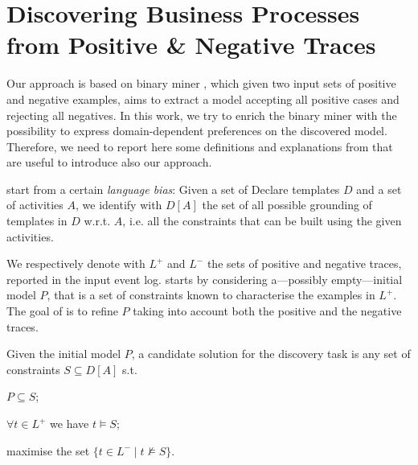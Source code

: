 
\section{Discovering Business Processes from Positive \& Negative Traces}
\label{sec:deviant}



Our approach is based on \nd binary miner \cite{deviant-tkde}, which given two input sets of positive and negative examples, aims to extract a model accepting all positive cases and rejecting all negatives. 
In this work, we try to enrich the binary miner with the possibility to express domain-dependent preferences on the discovered model. Therefore, we need to report here some definitions and explanations from \cite{deviant-tkde} that are useful to introduce also our approach.

\nd start from a certain \emph{language bias}: Given a set of Declare templates $D$ and a set of activities $A$, we identify with $D[A]$ the set of all possible grounding of templates in $D$ w.r.t. $A$, i.e. all the constraints that can be built using the given activities.

We respectively denote with $L^+$ and $L^-$ the sets of positive and negative traces, reported in the input event log. \nd starts by considering a---possibly empty---initial model $P$, that is a set of \declare constraints known to characterise the examples in $L^+$. The goal of \nd is to refine $P$ taking into account both the positive and the negative traces.

\begin{definition}{}\label{def:cand}
Given the initial model $P$, a candidate solution for the discovery task is any set of constraints $S\subseteq D[A]$ s.t.
\begin{enumerate*} [label=\textit{(\roman*)}]
  \item $P\subseteq S$;
  \item $\forall t\in L^+$ we have $t\models S$;
  \item maximise the set $\{t\in L^-\mid t\not\models S\}$.
\end{enumerate*}
\end{definition}


